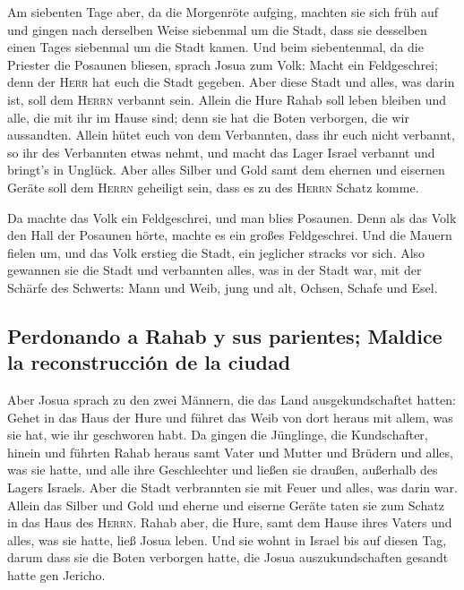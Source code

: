  Am siebenten Tage aber, da die Morgenröte aufging,
machten sie sich früh auf und gingen nach derselben Weise siebenmal um
die Stadt, dass sie desselben einen Tages siebenmal um die Stadt kamen.
 Und beim siebentenmal, da die Priester die Posaunen
bliesen, sprach Josua zum Volk: Macht ein Feldgeschrei; denn der
\textsc{Herr} hat euch die Stadt gegeben.  Aber diese
Stadt und alles, was darin ist, soll dem \textsc{Herrn} verbannt sein.
Allein die Hure Rahab soll leben bleiben und alle, die mit ihr im Hause
sind; denn sie hat die Boten verborgen, die wir aussandten.
 Allein hütet euch von dem Verbannten, dass ihr euch
nicht verbannt, so ihr des Verbannten etwas nehmt, und macht das Lager
Israel verbannt und bringt's in Unglück.  Aber alles
Silber und Gold samt dem ehernen und eisernen Geräte soll dem
\textsc{Herrn} geheiligt sein, dass es zu des \textsc{Herrn} Schatz
komme.

 Da machte das Volk ein Feldgeschrei, und man blies
Posaunen. Denn als das Volk den Hall der Posaunen hörte, machte es ein
großes Feldgeschrei. Und die Mauern fielen um, und das Volk erstieg die
Stadt, ein jeglicher stracks vor sich. Also gewannen sie die Stadt
 und verbannten alles, was in der Stadt war, mit der
Schärfe des Schwerts: Mann und Weib, jung und alt, Ochsen, Schafe und
Esel.

\hypertarget{perdonando-a-rahab-y-sus-parientes-maldice-la-reconstrucciuxf3n-de-la-ciudad}{%
\subsection{Perdonando a Rahab y sus parientes; Maldice la
reconstrucción de la
ciudad}\label{perdonando-a-rahab-y-sus-parientes-maldice-la-reconstrucciuxf3n-de-la-ciudad}}

 Aber Josua sprach zu den zwei Männern, die das Land
ausgekundschaftet hatten: Gehet in das Haus der Hure und führet das Weib
von dort heraus mit allem, was sie hat, wie ihr geschworen habt.
 Da gingen die Jünglinge, die Kundschafter, hinein und
führten Rahab heraus samt Vater und Mutter und Brüdern und alles, was
sie hatte, und alle ihre Geschlechter und ließen sie draußen, außerhalb
des Lagers Israels.  Aber die Stadt verbrannten sie mit
Feuer und alles, was darin war. Allein das Silber und Gold und eherne
und eiserne Geräte taten sie zum Schatz in das Haus des \textsc{Herrn}.
 Rahab aber, die Hure, samt dem Hause ihres Vaters und
alles, was sie hatte, ließ Josua leben. Und sie wohnt in Israel bis auf
diesen Tag, darum dass sie die Boten verborgen hatte, die Josua
auszukundschaften gesandt hatte gen Jericho.

